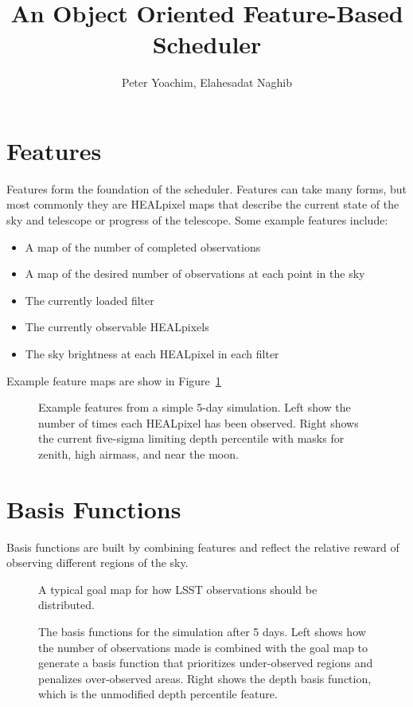 \documentclass[12pt,preprint]{aastex}
\begin{document}
\title{An Object Oriented Feature-Based Scheduler}


\author{Peter Yoachim, Elahesadat Naghib}

\section{Features}
Features form the foundation of the scheduler. Features can take many forms, but most commonly they are HEALpixel maps that describe the current state of the sky and telescope or progress of the telescope. Some example features include:
\begin{itemize}
    \item{A map of the number of completed observations}
    \item{A map of the desired number of observations at each point in the sky}
    \item{The currently loaded filter}
    \item{The currently observable HEALpixels}
    \item{The sky brightness at each HEALpixel in each filter}
\end{itemize}
Example feature maps are show in Figure~\ref{features}

\begin{figure}
\caption{Example features from a simple 5-day simulation. Left show the number of times each HEALpixel has been observed. Right shows the current five-sigma limiting depth percentile with masks for zenith, high airmass, and near the moon. \label{features}}
\end{figure}


\section{Basis Functions}
Basis functions are built by combining features and reflect the relative reward of observing different regions of the sky.

\begin{figure}
\caption{A typical goal map for how LSST observations should be distributed. \label{goal}}
\end{figure}


\begin{figure}
\caption{The basis functions for the simulation after 5 days. Left shows how the number of observations made is combined with the goal map to generate a basis function that prioritizes under-observed regions and penalizes over-observed areas. Right shows the depth basis function, which is the unmodified depth percentile feature.\label{basis_funcs}}
\end{figure}
\end{document}
